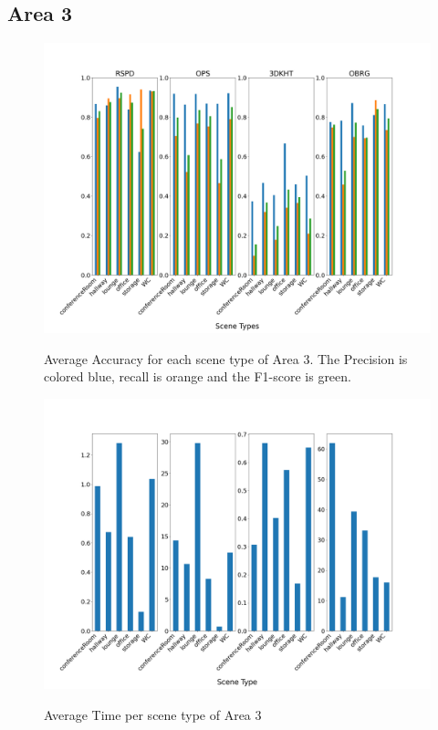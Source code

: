\documentclass[main.tex]{subfiles}
\begin{document}
\subsection{Area 3}

\begin{figure}[H]
    \centering
    \includegraphics[width=15 cm]{images/area_3_acc.png}
    \label{fig:area3A}
    \caption[Accuracies Area 3]{Average Accuracy for each scene type of Area 3. The Precision
        is colored blue, recall is orange and the F1-score is green. }
\end{figure}


\begin{figure}[H]
    \centering
    \includegraphics[width=15 cm]{images/area_3_time.png}
    \label{fig:area3T}
    \caption[Times Area 3]{Average Time per scene type of Area 3}
\end{figure}
\end{document}
